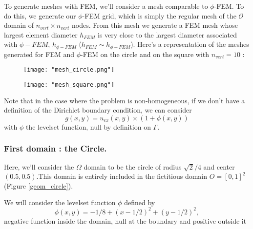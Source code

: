 \begin{Rem}
	To generate meshes with FEM, we'll consider a mesh comparable to $\phi$-FEM. To do this, we generate our $\phi$-FEM grid, which is simply the regular mesh of the $\mathcal{O}$ domain of $n_{vert}\times n_{vert}$ nodes. From this mesh we generate a FEM mesh whose largest element diameter $h_{FEM}$ is very close to the largest diameter associated with $\phi-FEM$, $h_{\phi-FEM}$ ($h_{FEM}\sim h_{\phi-FEM}$). Here's a representation of the meshes generated for FEM and $\phi$-FEM on the circle and on the square with $n_{vert}=10$ :
	
	\begin{minipage}{0.48\linewidth}
		\begin{figure}[H]
			\centering
			\texttt{[image: "mesh\_circle.png"]}
			\label{mesh_circle}
		\end{figure} 
	\end{minipage}
	\begin{minipage}{0.48\linewidth}
		\begin{figure}[H]
			\centering
			\texttt{[image: "mesh\_square.png"]}
			\label{mesh_square}
		\end{figure} 
	\end{minipage}
\end{Rem}

\begin{Rem}
	Note that in the case where the problem is non-homogeneous, if we don't have a definition of the Dirichlet boundary condition, we can consider
	\begin{equation*}
	g(x,y)=u_{ex}(x,y)\times(1+\phi(x,y))
	\end{equation*}
	with $\phi$ the levelset function, null by definition on $\Gamma$.
\end{Rem}

\subsubsection{First domain : the Circle.} \label{Corr.pb.circle}

Here, we'll consider the $\Omega$ domain to be the circle of radius $\sqrt{2}/4$ and center $(0.5,0.5)$.This domain is entirely included in the fictitious domain $O=[0,1]^2$ (Figure \ref{geom_circle}).

We will consider the levelset function $\phi$ defined by
\begin{equation*}
	\phi(x,y)=-1/8+(x-1/2)^2+(y-1/2)^2,
\end{equation*}
negative function inside the domain, null at the boundary and positive outside it
	
